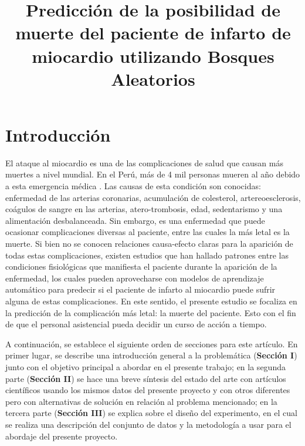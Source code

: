 \documentclass[conference]{IEEEtran}
\begin{document}
\title{Predicción de la posibilidad de muerte del paciente de infarto de miocardio utilizando Bosques Aleatorios}

\author{
\and
{}
\and
{}
}

\maketitle

\section{\textbf{Introducción}}
El ataque al miocardio es una de las complicaciones de salud que causan más muertes a nivel mundial. En el Perú, más de 4 mil personas mueren al año debido a esta emergencia médica \cite{b2}. Las causas de esta condición son conocidas: enfermedad de las arterias coronarias, acumulación de colesterol, artereoesclerosis, coágulos de sangre en las arterias, atero-trombosis, edad, sedentarismo y una alimentación desbalanceada. Sin embargo, es una enfermedad que puede ocasionar complicaciones diversas al paciente, entre las cuales la más letal es la muerte. Si bien no se conocen relaciones causa-efecto claras para la aparición de todas estas complicaciones, existen estudios que han hallado patrones entre las condiciones fisiológicas que manifiesta el paciente durante la aparición de la enfermedad, los cuales pueden aprovecharse con modelos de aprendizaje automático para predecir si el paciente de infarto al miocardio puede sufrir alguna de estas complicaciones\cite{b1}. En este sentido, el presente estudio se focaliza en la predicción de la complicación más letal: la muerte del paciente. Esto con el fin de que el personal asistencial pueda decidir un curso de acción a tiempo. 

A continuación, se establece el siguiente orden de secciones para este artículo. En primer lugar, se describe una introducción general a la problemática (\textbf{Sección I}) junto con el objetivo principal a abordar en el presente trabajo; en la segunda parte (\textbf{Sección II}) se hace una breve síntesis del estado del arte con artículos científicos usando los mismos datos del presente proyecto y con otros diferentes pero con alternativas de solución en relación al problema mencionado; en la tercera parte (\textbf{Sección III}) se explica sobre el diseño del experimento, en el cual se realiza una descripción del conjunto de datos y la metodología a usar para el abordaje del presente proyecto.
\end{document}
